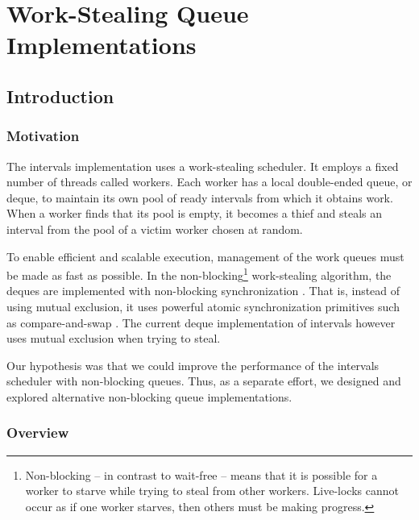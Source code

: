 
\part{Work-Stealing Queue Implementations}
\label{part:queues}

\chapter{Introduction}
\label{chap:queues-introduction}

\section{Motivation}
\label{sec:queues-intro-motivation}

The intervals implementation uses a work-stealing scheduler. It
employs a fixed number of threads called workers. Each worker has a
local double-ended queue, or deque, to maintain its own pool of ready
intervals from which it obtains work. When a worker finds that its
pool is empty, it becomes a thief and steals an interval from the pool
of a victim worker chosen at random.

To enable efficient and scalable execution, management of the work
queues must be made as fast as possible. In the
non-blocking\footnote{Non-blocking -- in contrast to wait-free
  \cite{Herlihy1991} -- means that it is possible for a worker to
  starve while trying to steal from other workers. Live-locks cannot
  occur as if one worker starves, then others must be making
  progress.} work-stealing algorithm, the deques are implemented with
non-blocking synchronization \cite{Arora2001}. That is, instead of
using mutual exclusion, it uses powerful atomic synchronization
primitives such as compare-and-swap \cite{Moir1997}. The current deque
implementation of intervals however uses mutual exclusion when trying
to steal.

Our hypothesis was that we could improve the performance of the
intervals scheduler with non-blocking queues. Thus, as a separate
effort, we designed and explored alternative non-blocking queue
implementations.

\section{Overview}
\label{sec:queues-intro-overview}

